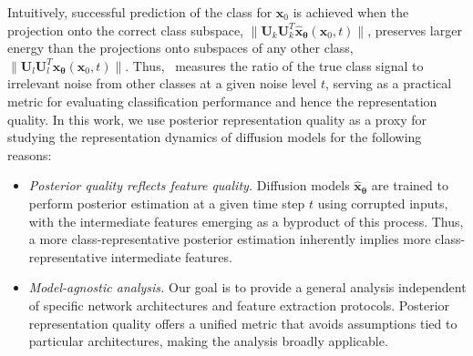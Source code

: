 Intuitively, successful prediction of the class for $\bm x_0$ is achieved when the projection onto the correct class subspace, $\|\bm U_k\bm U_k^T \hat{\bm x}_{\bm \theta}(\bm x_0, t)\|$, preserves larger energy than the projections onto subspaces of any other class, $\|\bm U_l\bm U_l^T \hat{\bm x}_{\bm \theta}(\bm x_0, t)\|$. Thus, \CSNR~measures the ratio of the true class signal to irrelevant noise from other classes at a given noise level $t$, serving as a practical metric for evaluating classification performance and hence the representation quality. In this work, we use posterior representation quality as a proxy for studying the representation dynamics of diffusion models for the following reasons:
\begin{itemize}[leftmargin=*]
    \item \emph{Posterior quality reflects feature quality.} Diffusion models $\hat{\bm{x}}_{\bm{\theta}}$ are trained to perform posterior estimation at a given time step $t$ using corrupted inputs, with the intermediate features emerging as a byproduct of this process. Thus, a more class-representative posterior estimation inherently implies more class-representative intermediate features.
    \item \emph{Model-agnostic analysis.} Our goal is to provide a general analysis independent of specific network architectures and feature extraction protocols. Posterior representation quality offers a unified metric that avoids assumptions tied to particular architectures, making the analysis broadly applicable.
\end{itemize}



